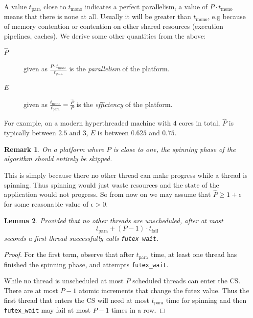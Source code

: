 \documentclass{sig-alternate-05-2015}
\newtheorem{remark}{Remark}[section]
\newtheorem{lemma}[remark]{Lemma}
\begin{document}
A value $t_{\textrm{para}}$ close to $t_{\textrm{mono}}$ indicates
a perfect parallelism, a value of $P \cdot t_{\textrm{mono}}$
means that there is none at all. Usually it will be greater than
$t_{\textrm{mono}}$, e.g because of memory contention or
contention on other shared resources (execution pipelines,
caches). We derive some other quantities from the
above:\vspace*{-1ex}

\begin{description}
\item[{$\widehat{P}$}] given as $\frac{P\cdot
                       t_{\textrm{mono}}}{t_{\textrm{para}}}$ is the
\emph{parallelism} of the platform.

\item[{$E$}] given as $\frac{t_\textrm{mono}}{t_{\textrm{para}}} =
             \frac{\widehat{P}}{P}$ is the \emph{efficiency} of the
platform.
\end{description}

For example, on a modern hyperthreaded machine with $4$ cores in
total, $\widehat{P}$ is typically between $2.5$ and $3$, $E$ is
between $0.625$ and $0.75$.

\begin{remark}
On a platform where $\widehat{P}$ is close to one, the spinning
phase of the algorithm should entirely be skipped.
\end{remark}

This is simply because there no other thread can make progress
while a thread is spinning. Thus spinning would just waste
resources and the state of the application would not progress.  So
from now on we may assume that $\widehat{P} \geq 1+\epsilon$ for some
reasonable value of $\epsilon > 0$.

\begin{lemma}
Provided that no other threads are unscheduled, after at most
$$t_{\textrm{para}} + (P-1)\cdot t_{\textrm{fail}}$$
seconds a first thread successfully calls \texttt{futex\_wait}.
\end{lemma}

\begin{proof}
For the first term, observe that after $t_{\textrm{para}}$ time,
at least one thread has finished the spinning phase, and attempts
\texttt{futex\_wait}.

While no thread is unscheduled at most $P$ scheduled threads can
enter the CS. There are at most $P-1$ atomic
increments that change the futex value. Thus the first thread that
enters the CS will need at most $t_{\textrm{para}}$
time for spinning and then \texttt{futex\_wait} may fail at most $P-1$
times in a row.
\end{proof}
\end{document}
